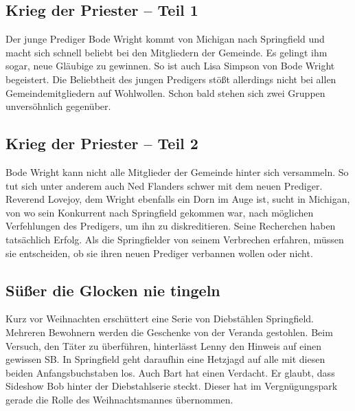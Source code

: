 
\subsection{Krieg der Priester -- Teil 1}
Der junge Prediger Bode Wright kommt von Michigan nach Springfield und macht sich schnell beliebt bei den Mitgliedern der Gemeinde. Es gelingt ihm sogar, neue Gläubige zu gewinnen. So ist auch Lisa Simpson von Bode Wright begeistert. Die Beliebtheit des jungen Predigers stößt allerdings nicht bei allen Gemeindemitgliedern auf Wohlwollen. Schon bald stehen sich zwei Gruppen unversöhnlich gegenüber.


\subsection{Krieg der Priester -- Teil 2}
Bode Wright kann nicht alle Mitglieder der Gemeinde hinter sich versammeln. So tut sich unter anderem auch Ned Flanders schwer mit dem neuen Prediger. Reverend Lovejoy, dem Wright ebenfalls ein Dorn im Auge ist, sucht in Michigan, von wo sein Konkurrent nach Springfield gekommen war, nach möglichen Verfehlungen des Predigers, um ihn zu diskreditieren. Seine Recherchen haben tatsächlich Erfolg. Als die Springfielder von seinem Verbrechen erfahren, müssen sie entscheiden, ob sie ihren neuen Prediger verbannen wollen oder nicht.


\subsection{Süßer die Glocken nie tingeln}\label{ZABF0}
Kurz vor Weihnachten erschüttert eine Serie von Diebstählen Springfield. Mehreren Bewohnern werden die Geschenke von der Veranda gestohlen. Beim Versuch, den Täter zu überführen, hinterlässt Lenny den Hinweis auf einen gewissen \glqq SB\grqq . In Springfield geht daraufhin eine Hetzjagd auf alle mit diesen beiden Anfangsbuchstaben los. Auch Bart hat einen Verdacht. Er glaubt, dass Sideshow Bob hinter der Diebstahlserie steckt. Dieser hat im Vergnügungspark gerade die Rolle des Weihnachtsmannes übernommen.

